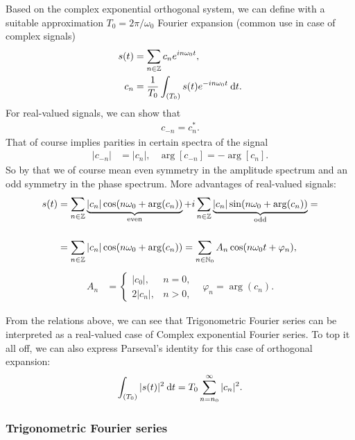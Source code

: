 \documentclass[11pt,a4paper]{report}
\theoremstyle{remark}
\theoremstyle{definition}
\begin{document}
					Based on the complex exponential orthogonal system, we can define with a suitable approximation $T_0 = 2 \pi / \omega_0$ Fourier expansion (common use in case of complex signals)
					\begin{align}
						\label{eq:complexpfs}
						s(t) &= \sum_{n \in {\mathbb Z}} c_n e^{i n \omega_0 t},
					\\
						c_n &= \frac{1}{T_0} \int_{(T_0)} s(t) e^{-i n \omega_0 t} \: {\mathrm d} t.
					\end{align}
					For real-valued signals, we can show that
					\begin{align}
						c_{-n} = c_n^*.
					\end{align}
					That of course implies parities in certain spectra of the signal
					\begin{align}
						|c_{-n}| &= |c_n|, & \arg[c_{-n}] = -\arg[c_n].
					\end{align}
					So by that we of course mean even symmetry in the amplitude spectrum and an odd symmetry in the phase spectrum. More advantages of real-valued signals:
					\begin{align}
					s(t) &= \sum_{n \in {\mathbb Z}} \underbrace{|c_n| \cos(n \omega_0 + \arg(c_n))}_{\mathrm{even}} + i \sum_{n \in {\mathbb Z}} \underbrace{|c_n| \sin(n \omega_0 + \arg(c_n))}_{\mathrm{odd}} =
					\\[5mm]
					&= \sum_{n \in {\mathbb Z}} |c_n| \cos(n \omega_0 + \arg(c_n)) = \sum_{n \in {\mathbb N}_0} A_n \cos(n \omega_0 t + \varphi_n),
					\end{align}
					\begin{align}
						A_n &= \left\{ \begin{matrix}
								|c_0|, & n = 0, \\
								2 |c_n|, & n > 0,
							\end{matrix} \right.
					&
						\varphi_n = \arg(c_n).
					\end{align}
					
					From the relations above, we can see that Trigonometric Fourier series can be interpreted as a real-valued case of Complex exponential Fourier series. To top it all off, we can also express Parseval's identity for this case of orthogonal expansion:
					\begin{align}
						\label{eq:complexppars}
						\int_{(T_0)} |s(t)|^2 \: {\mathrm d} t = T_0 \sum_{n=n_0}^{\infty} |c_n|^2.
					\end{align}
					
				\subsubsection{Trigonometric Fourier series}
					
\end{document}
